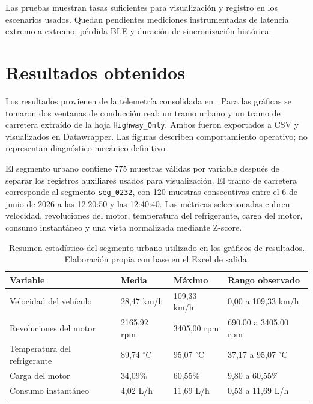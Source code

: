 \documentclass[12pt,letterpaper]{report}
\begin{document}
Las pruebas muestran tasas suficientes para visualización y registro en los escenarios usados. Quedan pendientes mediciones instrumentadas de latencia extremo a extremo, pérdida BLE y duración de sincronización histórica.

\section{Resultados obtenidos}

Los resultados provienen de la telemetría consolidada en . Para las gráficas se tomaron dos ventanas de conducción real: un tramo urbano y un tramo de carretera extraído de la hoja \texttt{Highway\_Only}. Ambos fueron exportados a CSV y visualizados en Datawrapper. Las figuras describen comportamiento operativo; no representan diagnóstico mecánico definitivo.

El segmento urbano contiene 775 muestras válidas por variable después de separar los registros auxiliares usados para visualización. El tramo de carretera corresponde al segmento \texttt{seg\_0232}, con 120 muestras consecutivas entre el 6 de junio de 2026 a las 12:20:50 y las 12:40:40. Las métricas seleccionadas cubren velocidad, revoluciones del motor, temperatura del refrigerante, carga del motor, consumo instantáneo y una vista normalizada mediante Z-score.

\begin{table}[!htbp]
\centering
\scriptsize
\caption{Resumen estadístico del segmento urbano utilizado en los gráficos de resultados. Elaboración propia con base en el Excel de salida.}
\label{tab:resultados-datawrapper-resumen}
\begin{tabular}{@{}p{}p{}p{}p{}@{}}
\toprule
\textbf{Variable} & \textbf{Media} & \textbf{Máximo} & \textbf{Rango observado} \\
\midrule
Velocidad del vehículo & 28,47 km/h & 109,33 km/h & 0,00 a 109,33 km/h \\
\addlinespace
Revoluciones del motor & 2165,92 rpm & 3405,00 rpm & 690,00 a 3405,00 rpm \\
\addlinespace
Temperatura del refrigerante & 89,74 $^\circ$C & 95,07 $^\circ$C & 37,17 a 95,07 $^\circ$C \\
\addlinespace
Carga del motor & 34,09\% & 60,55\% & 9,80 a 60,55\% \\
\addlinespace
Consumo instantáneo & 4,02 L/h & 11,69 L/h & 0,53 a 11,69 L/h \\
\bottomrule
\end{tabular}
\end{table}
\end{document}
